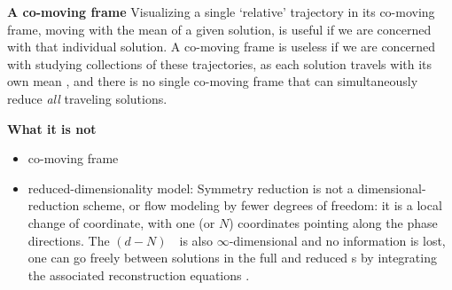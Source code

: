 {\bf A co-moving frame}
Visualizing a single `relative' trajectory in its co-moving frame, moving with
the mean {\phaseVel} of a given solution, is useful if we are
concerned with that individual solution. A co-moving frame is useless if
we are concerned with studying collections of these trajectories, as each
solution travels with its own mean {\phaseVel}, and there is no single
co-moving frame that can simultaneously reduce \emph{all} traveling
solutions.

{\bf What it is not}
    \begin{itemize}
      \item co-moving frame
      \item reduced-dimensionality model: Symmetry reduction is not a
          dimensional-reduction scheme, or flow modeling by fewer degrees
          of freedom: it is a local change of coordinate, with one (or
          $N$) coordinates pointing along the phase directions. The
          $(d\!-\!N)$\dmn\ \reducedsp\ is also $\infty$-dimensional and
          no information is lost, one can go freely between solutions in
          the full and reduced \statesp s by integrating the associated
          {reconstruction equations} .
    \end{itemize}
